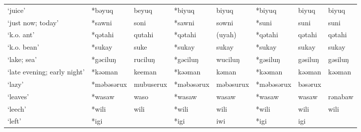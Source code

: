 \begin{landscape}
\begin{longtable}[c]{@{}p{3cm}<{\raggedright}p{2.75cm}<{\raggedright}p{2.75cm}<{\raggedright}p{2.75cm}<{\raggedright}p{2.75cm}<{\raggedright}p{2.75cm}<{\raggedright}p{2.75cm}<{\raggedright}p{2.75cm}<{\raggedright}@{}}
`juice'                                              & *bəyuq             & beyuq                          & *biyuq             & biyuq                      & *biyuq           & biyuq                    & biyuq                             \\
`just now; today'                                    & *sawni             & soni                           & *sawni             & sowni                      & *suni            & suni                     & suni                              \\
`k.o. ant'                                           & *qətahi            & qutahi                         & *qətahi            & (uyah)                     & *qətahi          & qətahi                   & qətahi                            \\
`k.o. bean'                                          & *sukay             & suke                           & *sukay             & sukay                      & *sukay           & sukay                    & sukay                             \\
`lake; sea'                                          & *gəciluŋ           & ruciluŋ                        & *gəciluŋ           & wuciluŋ                    & *gəsiluŋ         & gəsiluŋ                  & gəsiluŋ                           \\
`late evening; early night'                          & *kəəman            & keeman                         & *kəəman            & kəman                      & *kəəman          & kəəman                   & kəəman                            \\
`lazy'                                               & *məbəsərux         & mubuserux                      & *məbəsərux         & məbəsurux                  & *məbəsərux       & bəsərux                  &                                   \\
`leaves'                                             & *wasaw             & waso                           & *wasaw             & wasaw                      & *wasaw           & wasaw                    & rənabaw                           \\
`leech'                                              & *wili              & wili                           & *wili              & wili                       & *wili            & wili                     & wili                              \\
`left'                                               & *igi               &                                & *igi               & iwi                        & *igi             & igi                      &                                   \\

\end{longtable}
\end{landscape}
